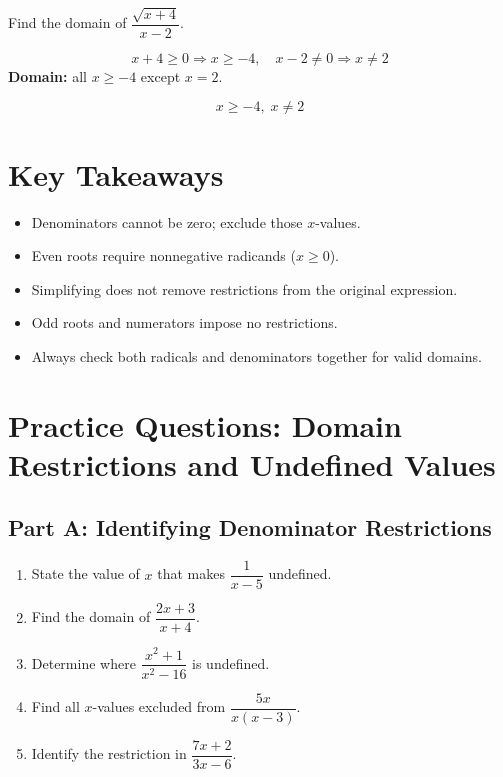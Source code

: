 \documentclass[12pt]{article}
\begin{document}
Find the domain of \(\dfrac{\sqrt{x + 4}}{x - 2}\).

\[
x + 4 \ge 0 \Rightarrow x \ge -4, \quad x - 2 \ne 0 \Rightarrow x \ne 2
\]
\textbf{Domain:} all \(x \ge -4\) except \(x = 2.\)

\[
\boxed{x \ge -4, \; x \ne 2}
\]

\section*{Key Takeaways}
\begin{itemize}
  \item Denominators cannot be zero; exclude those \(x\)-values.
  \item Even roots require nonnegative radicands (\(x \ge 0\)).
  \item Simplifying does not remove restrictions from the original expression.
  \item Odd roots and numerators impose no restrictions.
  \item Always check both radicals and denominators together for valid domains.
\end{itemize}

\newpage


\section*{Practice Questions: Domain Restrictions and Undefined Values}

\subsection*{Part A: Identifying Denominator Restrictions}
\begin{enumerate}
  \item State the value of \(x\) that makes \(\dfrac{1}{x - 5}\) undefined.
  \item Find the domain of \(\dfrac{2x + 3}{x + 4}\).
  \item Determine where \(\dfrac{x^2 + 1}{x^2 - 16}\) is undefined.
  \item Find all \(x\)-values excluded from \(\dfrac{5x}{x(x - 3)}\).
  \item Identify the restriction in \(\dfrac{7x + 2}{3x - 6}\).
\end{enumerate}
\end{document}
